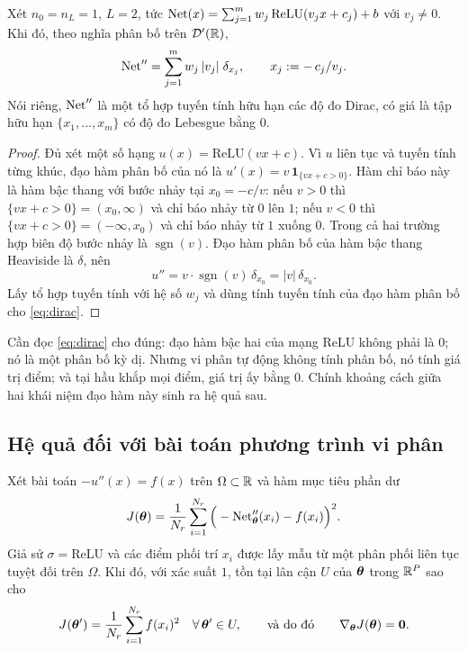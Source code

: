 \begin{menhde}
\label{md:dirac}
Xét $n_0 = n_L = 1$, $L = 2$, tức
$\operatorname{Net}(x) = \sum_{j=1}^{m} w_j\,\mathrm{ReLU}(v_j x + c_j) + b$ với
$v_j \ne 0$. Khi đó, theo nghĩa phân bố trên $\mathcal{D}'(\mathbb{R})$,
\begin{equation}
\operatorname{Net}'' = \sum_{j=1}^{m} w_j\, |v_j|\; \delta_{x_j},
\qquad x_j := -\,c_j/v_j .
\label{eq:dirac}
\end{equation}
Nói riêng, $\operatorname{Net}''$ là một tổ hợp tuyến tính hữu hạn các độ đo Dirac, có giá là
tập hữu hạn $\{x_1,\dots,x_m\}$ có độ đo Lebesgue bằng $0$.
\end{menhde}
 
\begin{proof}
Đủ xét một số hạng $u(x) = \mathrm{ReLU}(vx+c)$. Vì $u$ liên tục và tuyến tính
từng khúc, đạo hàm phân bố của nó là
$u'(x) = v\,\mathbf{1}_{\{vx+c>0\}}$. Hàm chỉ báo này là hàm bậc thang với bước
nhảy tại $x_0 = -c/v$: nếu $v > 0$ thì $\{vx+c>0\} = (x_0,\infty)$ và chỉ báo
nhảy từ $0$ lên $1$; nếu $v<0$ thì $\{vx+c>0\} = (-\infty,x_0)$ và chỉ báo nhảy
từ $1$ xuống $0$. Trong cả hai trường hợp biên độ bước nhảy là
$\operatorname{sgn}(v)$. Đạo hàm phân bố của hàm bậc thang Heaviside là $\delta$,
nên
\[
u'' = v \cdot \operatorname{sgn}(v)\,\delta_{x_0} = |v|\,\delta_{x_0}.
\]
Lấy tổ hợp tuyến tính với hệ số $w_j$ và dùng tính tuyến tính của đạo hàm phân
bố cho \eqref{eq:dirac}.
\end{proof}
 
Cần đọc \eqref{eq:dirac} cho đúng: đạo hàm bậc hai của mạng ReLU không phải là
$0$; nó là một phân bố kỳ dị. Nhưng vi phân tự động không tính phân bố, nó tính
giá trị điểm; và tại hầu khắp mọi điểm, giá trị ấy bằng $0$. Chính khoảng cách
giữa hai khái niệm đạo hàm này sinh ra hệ quả sau.
 
\subsection{Hệ quả đối với bài toán phương trình vi phân}
 
\begin{hequa}
\label{hq:pinn-hong}
Xét bài toán $-u''(x) = f(x)$ trên $\Omega \subset \mathbb{R}$ và hàm mục tiêu phần dư
\begin{equation}
J(\bm{\theta}) = \frac{1}{N_r}\sum_{i=1}^{N_r}
  \Big( -\operatorname{Net}''_{\bm{\theta}}(x_i) - f(x_i) \Big)^{2}.
\label{eq:J-residual}
\end{equation}
Giả sử $\sigma = \mathrm{ReLU}$ và các điểm phối trí $x_i$ được lấy mẫu từ một
phân phối liên tục tuyệt đối trên $\Omega$. Khi đó, với xác suất $1$, tồn tại
lân cận $U$ của $\bm{\theta}$ trong $\mathbb{R}^P$ sao cho
\begin{equation}
J(\bm{\theta}') = \frac{1}{N_r}\sum_{i=1}^{N_r} f(x_i)^2
\quad \forall\, \bm{\theta}' \in U,
\qquad\text{và do đó}\qquad
\nabla_{\bm{\theta}} J(\bm{\theta}) = \bm{0}.
\label{eq:gradient-zero}
\end{equation}
\end{hequa}
 
